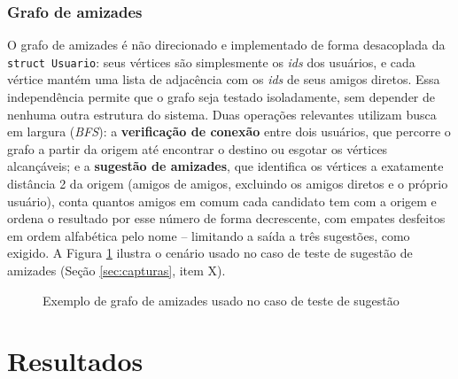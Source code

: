 \documentclass[
	12pt,				%
	oneside,			%
	a4paper,			%
	chapter=TITLE,		%
	brazil,				%
	]{abntex2}
\providecommand{\legend}[1]{\par\vspace{-0.4\baselineskip}{\footnotesize #1\par}\vspace{0.2cm}}
\begin{document}
\subsection{Grafo de amizades}

O grafo de amizades é não direcionado e implementado de forma desacoplada
da \texttt{struct Usuario}: seus vértices são simplesmente os \emph{ids}
dos usuários, e cada vértice mantém uma lista de adjacência com os
\emph{ids} de seus amigos diretos. Essa independência permite que o grafo
seja testado isoladamente, sem depender de nenhuma outra estrutura do
sistema. Duas operações relevantes utilizam busca em largura (\emph{BFS}):
a \textbf{verificação de conexão} entre dois usuários, que percorre o
grafo a partir da origem até encontrar o destino ou esgotar os vértices
alcançáveis; e a \textbf{sugestão de amizades}, que identifica os vértices
a exatamente distância 2 da origem (amigos de amigos, excluindo os amigos
diretos e o próprio usuário), conta quantos amigos em comum cada candidato
tem com a origem e ordena o resultado por esse número de forma
decrescente, com empates desfeitos em ordem alfabética pelo nome --
limitando a saída a três sugestões, como exigido. A Figura
\ref{fig:grafo} ilustra o cenário usado no caso de teste de sugestão de
amizades (Seção \ref{sec:capturas}, item X).

\begin{figure}[htb]
\centering
{}
\caption{Exemplo de grafo de amizades usado no caso de teste de sugestão}
\label{fig:grafo}
\legend{Fonte: elaborado pelos autores. A busca em largura a partir de E
alcança A em profundidade 2 (via B e via C), tornando A a única sugestão,
com 2 amigos em comum.}
\end{figure}

\chapter{Resultados}
\end{document}
